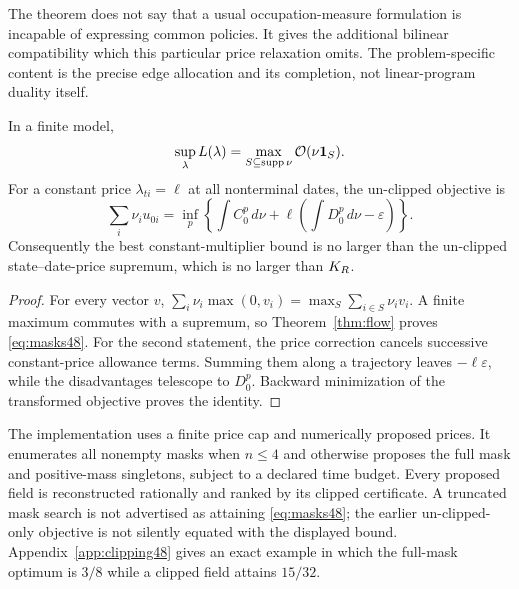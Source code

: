 The theorem does not say that a usual occupation-measure formulation is incapable of expressing common policies. It gives the additional bilinear compatibility which this particular price relaxation omits. The problem-specific content is the precise edge allocation and its completion, not linear-program duality itself.

\begin{corollary}\label{cor:clipping48}
In a finite model,
\begin{equation}\label{eq:masks48}
 \sup_\lambda L(\lambda)=\max_{S\subseteq\operatorname{supp}\nu}\mathcal O(\nu\mathbf 1_S).
\end{equation}
For a constant price $\lambda_{ti}=\ell$ at all nonterminal dates, the un-clipped objective is
\[
 \sum_i\nu_i u_{0i}=\inf_p\left\{\int C_0^p\,d\nu+\ell\left(\int D_0^p\,d\nu-\varepsilon\right)\right\}.
\]
Consequently the best constant-multiplier bound is no larger than the un-clipped state--date-price supremum, which is no larger than $K_R$.
\end{corollary}
\begin{proof}
For every vector $v$, $\sum_i\nu_i\max(0,v_i)=\max_S\sum_{i\in S}\nu_i v_i$. A finite maximum commutes with a supremum, so Theorem~\ref{thm:flow} proves \eqref{eq:masks48}. For the second statement, the price correction cancels successive constant-price allowance terms. Summing them along a trajectory leaves $-\ell\varepsilon$, while the disadvantages telescope to $D_0^p$. Backward minimization of the transformed objective proves the identity.
\end{proof}

The implementation uses a finite price cap and numerically proposed prices. It enumerates all nonempty masks when $n\le4$ and otherwise proposes the full mask and positive-mass singletons, subject to a declared time budget. Every proposed field is reconstructed rationally and ranked by its clipped certificate. A truncated mask search is not advertised as attaining \eqref{eq:masks48}; the earlier un-clipped-only objective is not silently equated with the displayed bound. Appendix~\ref{app:clipping48} gives an exact example in which the full-mask optimum is $3/8$ while a clipped field attains $15/32$.

